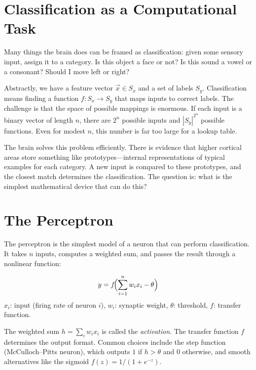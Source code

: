 \section{Classification as a Computational Task}
\label{sec:classification}

Many things the brain does can be framed as classification: given some sensory input, assign it to a category. Is this object a face or not? Is this sound a vowel or a consonant? Should I move left or right?

Abstractly, we have a feature vector $\vec{x} \in S_x$ and a set of labels $S_y$. Classification means finding a function $f: S_x \to S_y$ that maps inputs to correct labels. The challenge is that the space of possible mappings is enormous. If each input is a binary vector of length $n$, there are $2^n$ possible inputs and $|S_y|^{2^n}$ possible functions. Even for modest $n$, this number is far too large for a lookup table.

The brain solves this problem efficiently. There is evidence that higher cortical areas store something like prototypes---internal representations of typical examples for each category. A new input is compared to these prototypes, and the closest match determines the classification. The question is: what is the simplest mathematical device that can do this?

\section{The Perceptron}
\label{sec:perceptron}

The perceptron is the simplest model of a neuron that can perform classification. It takes $n$ inputs, computes a weighted sum, and passes the result through a nonlinear function:

\begin{keyequation}
\begin{equation}
  y = f\!\Bigl(\sum_{i=1}^{n} w_i x_i - \theta\Bigr)
  \label{eq:perceptron}
\end{equation}
\tcblower
$x_i$: input (firing rate of neuron $i$), \quad
$w_i$: synaptic weight, \quad
$\theta$: threshold, \quad
$f$: transfer function.
\end{keyequation}

\noindent The weighted sum $h = \sum_i w_i x_i$ is called the \emph{activation}. The transfer function $f$ determines the output format. Common choices include the step function (McCulloch--Pitts neuron), which outputs $1$ if $h > \theta$ and $0$ otherwise, and smooth alternatives like the sigmoid $f(z) = 1/(1 + e^{-z})$.


